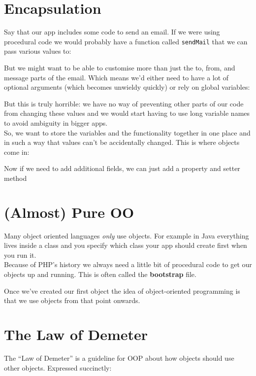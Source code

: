 \pagebreak


\section{Encapsulation}

Say that our app includes some code to send an email. If we were using procedural code we would probably have a function called \texttt{sendMail} that we can pass various values to:


But we might want to be able to customise more than just the to, from, and message parts of the email. Which means we'd either need to have a lot of optional arguments (which becomes unwieldy quickly) or rely on global variables:


But this is truly horrible: we have no way of preventing other parts of our code from changing these values and we would start having to use long variable names to avoid ambiguity in bigger apps.
\\

So, we want to store the variables and the functionality together in one place and in such a way that values can't be accidentally changed. This is where objects come in:


Now if we need to add additional fields, we can just add a property and setter method


\section{(Almost) Pure OO}

Many object oriented languages \textit{only} use objects. For example in Java everything lives inside a class and you specify which class your app should create first when you run it.
\\

Because of PHP's history we always need a little bit of procedural code to get our objects up and running. This is often called the \textbf{bootstrap} file.


Once we've created our first object the idea of object-oriented programming is that we use objects from that point onwards.


\section{The Law of Demeter}
The ``Law of Demeter'' is a guideline for OOP about how objects should use other objects. Expressed succinctly:

